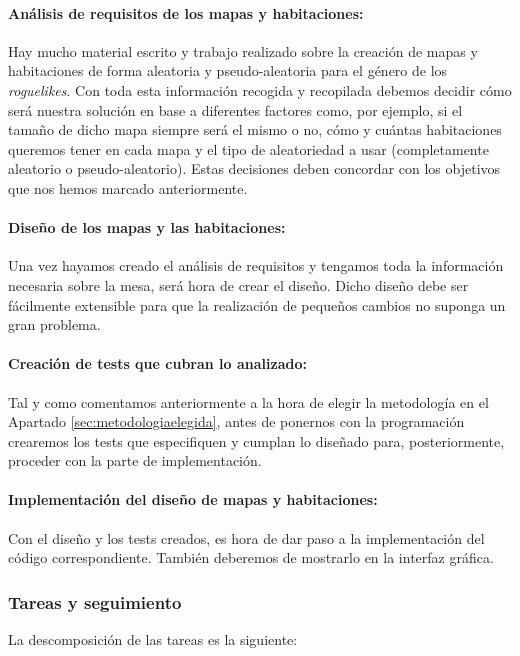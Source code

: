 \paragraph{Análisis de requisitos de los mapas y habitaciones:} Hay mucho material escrito y trabajo realizado sobre la creación de mapas y habitaciones de forma aleatoria y pseudo-aleatoria para el género de los \textit{roguelikes}\cite{book:swordscircuitry}. Con toda esta información recogida y recopilada debemos decidir cómo será nuestra solución en base a diferentes factores como, por ejemplo, si el tamaño de dicho mapa siempre será el mismo o no, cómo y cuántas habitaciones queremos tener en cada mapa y el tipo de aleatoriedad a usar (completamente aleatorio o pseudo-aleatorio). Estas decisiones deben concordar con los objetivos que nos hemos marcado anteriormente.

\paragraph{Diseño de los mapas y las habitaciones:} Una vez hayamos creado el análisis de requisitos y tengamos toda la información necesaria sobre la mesa, será hora de crear el diseño. Dicho diseño debe ser fácilmente extensible para que la realización de pequeños cambios no suponga un gran problema.

\paragraph{Creación de tests que cubran lo analizado:} Tal y como comentamos anteriormente a la hora de elegir la metodología en el Apartado \ref{sec:metodologiaelegida}, antes de ponernos con la programación crearemos los tests que especifiquen y cumplan lo diseñado para, posteriormente, proceder con la parte de implementación.

\paragraph{Implementación del diseño de mapas y habitaciones:} Con el diseño y los tests creados, es hora de dar paso a la implementación del código correspondiente. También deberemos de mostrarlo en la interfaz gráfica.

\subsubsection{Tareas y seguimiento}

La descomposición de las tareas es la siguiente:

